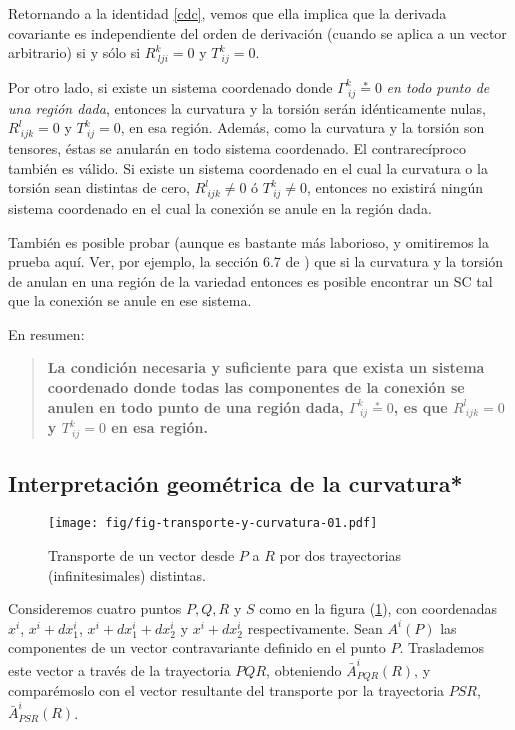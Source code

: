 Retornando a la identidad \eqref{cdc}, vemos que ella implica que la derivada covariante es independiente del orden de derivación (cuando se aplica a un vector arbitrario) si y sólo si $R_{\ lji}^k=0$ y $T_{\ ij}^{k}=0$.

Por otro lado, si existe un sistema coordenado donde $\Gamma_{\ ij}^k
\overset{\ast}{=}0$ \textit{en todo punto de una región dada}, entonces la curvatura y la torsión serán idénticamente nulas, $R_{\ ijk}^l =0$ y $T_{\ ij}^{k}=0$, en esa región. Además, como la curvatura y la torsión son tensores, éstas se anularán en todo sistema coordenado.
El contrarecíproco también es válido. Si existe un sistema
coordenado en el cual la curvatura o la torsión sean distintas de cero, $R_{\ ijk}^l \neq 0$ ó $T_{\ ij}^{k}\neq 0$, entonces no existirá ningún sistema coordenado en el cual la conexión se anule en la región dada.

También es posible probar (aunque es bastante más laborioso, y omitiremos la prueba aquí. Ver, por ejemplo, la sección 6.7 de \cite{Dinverno}) que si la curvatura y la torsión de anulan en una región de la variedad entonces es posible encontrar un SC tal que la conexión se anule en ese sistema.

En resumen:
\begin{quotation}
\textbf{La condición necesaria y suficiente para que exista un sistema coordenado donde todas las componentes de la conexión se anulen en todo punto de una región dada, $\Gamma_{\ ij}^k \overset{\ast}{=}0$, es que $R_{\ ijk}^l=0$ y $T_{\ ij}^k =0$ en esa región.}
\end{quotation}

\subsection{Interpretación geométrica de la curvatura*}
\begin{center}
\begin{figure}[h!]
\centerline{\texttt{[image: fig/fig-transporte-y-curvatura-01.pdf]}}
\caption{Transporte de un vector desde $P$ a $R$ por dos trayectorias (infinitesimales) distintas.}
\label{intgeomcurv}
\end{figure}
\end{center}

Consideremos cuatro puntos $P,Q,R$ y $S$ como en la figura (\ref{intgeomcurv}), con coordenadas $x^i $, $x^i+dx_1^i$, $x^i+dx_1^i+dx_2^i$ y $x^i+dx_2^i$ respectivamente.
Sean $A^i (P)$ las componentes de un vector contravariante definido en el punto $P$. Traslademos este vector a través de la trayectoria $PQR$, obteniendo $\bar{A}^i_{PQR}(R)$, y comparémoslo con el vector resultante del transporte por la trayectoria $PSR$, $\bar{A}^i_{PSR}(R)$.

